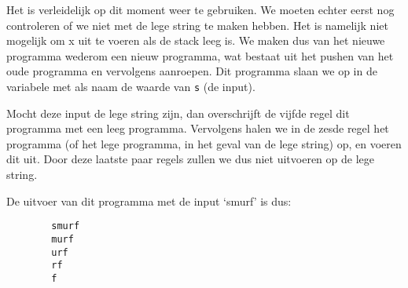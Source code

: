 \begin{exmp}
	Het is verleidelijk op dit moment weer  te gebruiken. We
	moeten echter eerst nog controleren of we niet met de lege string te maken
	hebben. Het is namelijk niet mogelijk om x uit te voeren als de stack leeg
	is. We maken dus van het nieuwe programma wederom een nieuw programma, wat
	bestaat uit het pushen van het oude programma en vervolgens 
	aanroepen. Dit programma slaan we op in de variabele met als naam de waarde
	van \verb$s$ (de input).

	Mocht deze input de lege string zijn, dan overschrijft de vijfde regel dit
	programma met een leeg programma. Vervolgens halen we in de zesde regel het
	programma (of het lege programma, in het geval van de lege string) op, en
	voeren dit uit. Door deze laatste paar regels zullen we dus niet
	 uitvoeren op de lege string.

	\medskip
	De uitvoer van dit programma met de input `smurf' is dus:

	\begin{verbatim}
		smurf
		murf
		urf
		rf
		f
	\end{verbatim}
\end{exmp}

